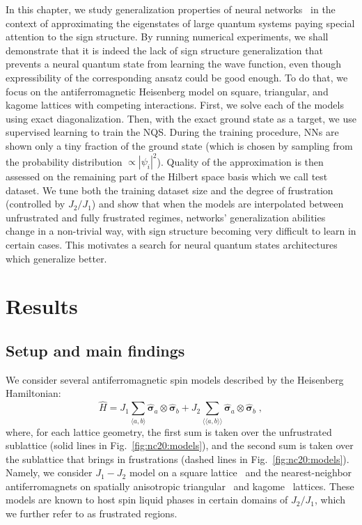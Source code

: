 In this chapter, we study generalization properties of neural networks~\cite{Hinton93keepingneural,dziugaite2017computing} in the context of approximating the eigenstates of large quantum systems paying special attention to the sign structure. By running numerical experiments, we shall demonstrate that it is indeed the lack of sign structure generalization that prevents a neural quantum state from learning the wave function, even though expressibility of the corresponding ansatz could be good enough. To do that, we focus on the antiferromagnetic Heisenberg model on square, triangular, and kagome lattices with competing interactions. First, we solve each of the models using exact diagonalization. Then, with the exact ground state as a target, we use supervised learning to train the NQS. During the training procedure, NNs are shown only a tiny fraction of the ground state (which is chosen by sampling from the probability distribution $\propto |\psi_i|^2$). Quality of the approximation is then assessed on the remaining part of the Hilbert space basis which we call test dataset. We tune both the training dataset size and the degree of frustration (controlled by $J_2/J_1$) and show that when the models are interpolated between unfrustrated and fully frustrated regimes, networks' generalization abilities change in a non-trivial way, with sign structure becoming very difficult to learn in certain cases. This motivates a search for neural quantum states architectures which generalize better.

\section{Results}

\subsection{Setup and main findings}

We consider several antiferromagnetic spin models described by the Heisenberg Hamiltonian:
\begin{equation}
    \hat H = J_1 \sum\limits_{\langle a, b \rangle} \hat{\boldsymbol{\sigma}}_a \otimes \hat{\boldsymbol{\sigma}}_b + J_2  \sum\limits_{\langle \langle a, b \rangle \rangle} \hat{\boldsymbol{\sigma}}_a \otimes \hat{\boldsymbol{\sigma}}_b \;,
\end{equation}
where, for each lattice geometry, the first sum is taken over the unfrustrated sublattice (solid lines in Fig.~\ref{fig:nc20:models}), and the second sum is taken over the sublattice that brings in frustrations (dashed lines in Fig.~\ref{fig:nc20:models}). Namely, we consider $J_1-J_2$ model on a square lattice~\cite{schulz1996magnetic,richter2010spin, jiang2012spin} and the nearest-neighbor antiferromagnets on spatially anisotropic triangular~\cite{yunoki2006two} and kagome~\cite{schnyder2008spatially,li2012spin} lattices. These models are known to host spin liquid phases in certain domains of $J_2/J_1$, which we further refer to as frustrated regions.

